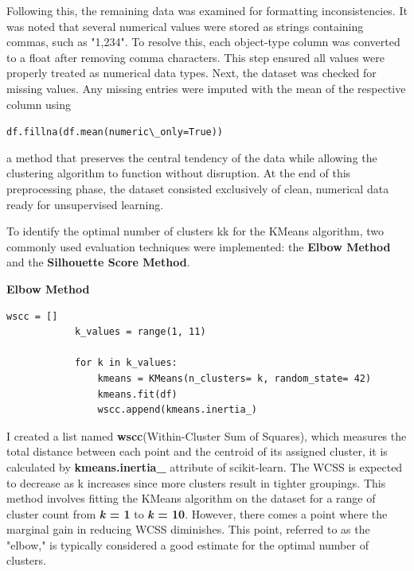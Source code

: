 \documentclass[a4paper,12pt]{article}
\begin{document}
\begin{itemize}[label= {*}, leftmargin= 1cm]
\begin{itemize}[label= {}, leftmargin= 1cm]
        Following this, the remaining data was examined for formatting inconsistencies. It was noted that several numerical values were stored as strings containing commas, such as "1,234". To resolve this, each object-type column was converted to a float after removing comma characters. This step ensured all values were properly treated as numerical data types. Next, the dataset was checked for missing values. Any missing entries were imputed with the mean of the respective column using
        
        \vspace{0.1cm}
        \verb|df.fillna(df.mean(numeric\_only=True))|
        \vspace{0.1cm}
        
        a method that preserves the central tendency of the data while allowing the clustering algorithm to function without disruption. At the end of this preprocessing phase, the dataset consisted exclusively of clean, numerical data ready for unsupervised learning.

        To identify the optimal number of clusters kk for the KMeans algorithm, two commonly used evaluation techniques were implemented: the \textbf{Elbow Method} and the \textbf{Silhouette Score Method}.
        \vspace{0.3cm}
        
        \textbf{Elbow Method}
        \begin{Verbatim}[xleftmargin=-1cm]
            wscc = []
            k_values = range(1, 11)
            
            for k in k_values:
                kmeans = KMeans(n_clusters= k, random_state= 42)
                kmeans.fit(df)
                wscc.append(kmeans.inertia_)
        \end{Verbatim}  
        \vspace{0.3cm}
        
        I created a list named \textbf{wscc}(Within-Cluster Sum of Squares), which measures the total distance between each point and the centroid of its assigned cluster, it is calculated by \textbf{kmeans.inertia\_} attribute of scikit-learn. The WCSS is expected to decrease as k increases since more clusters result in tighter groupings. This method involves fitting the KMeans algorithm on the dataset for a range of cluster count from \textbf{\textit{k} = 1} to \textbf{\textit{k} = 10}. However, there comes a point where the marginal gain in reducing WCSS diminishes. This point, referred to as the "elbow," is typically considered a good estimate for the optimal number of clusters.
        \vspace{0.3cm}


\end{itemize}
\end{itemize}
\end{document}

